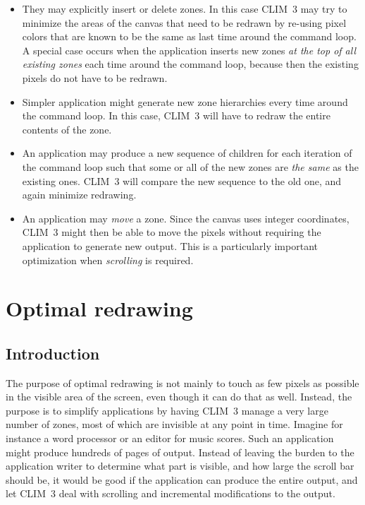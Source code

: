 \documentclass{report}
\def\clim{CLIM~3}
\begin{document}
\begin{itemize}
\item They may explicitly insert or delete zones.  In this case
\clim{} may try to minimize the areas of the canvas that need to be
redrawn by re-using pixel colors that are known to be the same as last
time around the command loop.  A special case occurs when the
application inserts new zones \emph{at the top of all existing zones}
each time around the command loop, because then the existing pixels do
not have to be redrawn.

\item Simpler application might generate new zone hierarchies every
time around the command loop.  In this case, \clim{} will have to
redraw the entire contents of the zone. 

\item An application may produce a new sequence of children for each
  iteration of the command loop such that some or all of the new zones
  are \emph{the same} as the existing ones.  \clim{} will compare the
  new sequence to the old one, and again minimize redrawing.

\item An application may \emph{move} a zone.  Since the canvas uses
  integer coordinates, \clim{} might then be able to move the pixels
  without requiring the application to generate new output.  This is
  a particularly important optimization when \emph{scrolling} is
  required. 

\end{itemize}

\chapter{Optimal redrawing}

\section{Introduction}

The purpose of optimal redrawing is not mainly to touch as few pixels
as possible in the visible area of the screen, even though it can do
that as well.  Instead, the purpose is to simplify applications by
having \clim{} manage a very large number of zones, most of which
are invisible at any point in time.  Imagine for instance a word
processor or an editor for music scores.  Such an application might
produce hundreds of pages of output.  Instead of leaving the burden to
the application writer to determine what part is visible, and how
large the scroll bar should be, it would be good if the application
can produce the entire output, and let \clim{} deal with scrolling and
incremental modifications to the output.  
\end{document}
